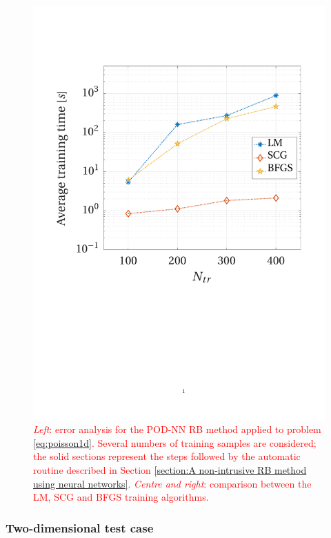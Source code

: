 \documentclass[longtitle]{elsarticle}
\numberwithin{equation}{section}
\theoremstyle{theorem}
\theoremstyle{definition}
\theoremstyle{remark}
\theoremstyle{proposition}
\numberwithin{figure}{section}
\begin{document}
\begin{figure}[t!]
			\includegraphics[scale = 0.3, trim = {1cm 9.8cm 1.5cm 3.5cm}, clip]{poisson1d_training_comparison_time}
			
			\caption{\textcolor{red}{\emph{Left}: error analysis for the POD-NN RB method applied to problem \eqref{eq:poisson1d}. Several numbers of training samples are considered; the solid sections represent the steps followed by the automatic routine described in Section \ref{section:A non-intrusive RB method using neural networks}. \emph{Centre and right}: comparison between the LM, SCG and BFGS training algorithms.}}
			\label{fig:poisson1d-fig2}
		\end{figure}
				
		
	
	\subsubsection{Two-dimensional test case}
	\label{section:Two-dimensional test case}
		
\end{document}
